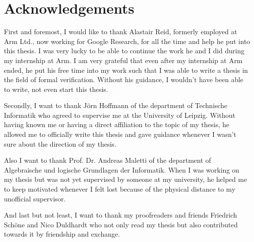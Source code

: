 \chapter*{\centering Acknowledgements}

First and foremost, I would like to thank Alastair Reid, formerly employed at Arm Ltd., now working for Google Research, for all the time and help he put into this thesis.
I was very lucky to be able to continue the work he and I did during my internship at Arm.
I am very grateful that even after my internship at Arm ended, he put his free time into my work such that I was able to write a thesis in the field of formal verification.
Without his guidance, I wouldn't have been able to write, not even start this thesis.

Secondly, I want to thank Jörn Hoffmann of the department of Technische Informatik who agreed to supervise me at the University of Leipzig.
Without having known me or having a direct affiliation to the topic of my thesis, he allowed me to officially write this thesis and gave guidance whenever I wasn't sure about the direction of my thesis.

Also I want to thank Prof. Dr. Andreas Maletti of the department of Algebraische und logische Grundlagen der Informatik.
When I was working on my thesis but was not yet supervised by someone at my university, he helped me to keep motivated whenever I felt lost because of the physical distance to my unofficial supervisor.

And last but not least, I want to thank my proofreaders and friends Friedrich Schöne and Nico Duldhardt who not only read my thesis but also contributed towards it by friendship and exchange.
